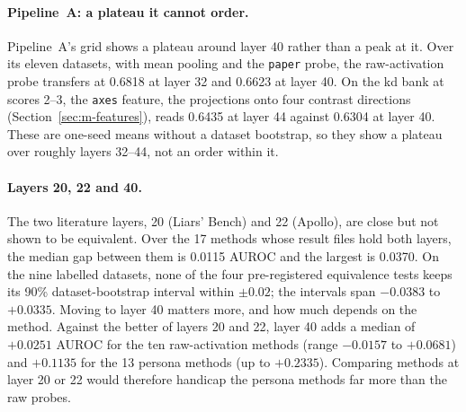 \paragraph{Pipeline~A: a plateau it cannot order.}
Pipeline~A's grid shows a plateau around layer 40 rather than a peak at it. %
Over its eleven datasets, with mean pooling and the \texttt{paper} probe, the raw-activation probe transfers at 0.6818 at layer 32 and 0.6623 at layer 40. %
On the kd bank at scores 2--3, the \texttt{axes} feature, the projections onto four contrast directions (Section~\ref{sec:m-features}), reads 0.6435 at layer 44 against 0.6304 at layer 40. %
These are one-seed means without a dataset bootstrap, so they show a plateau over roughly layers 32--44, not an order within it. %

\paragraph{Layers 20, 22 and 40.}
The two literature layers, 20 (Liars' Bench) and 22 (Apollo), are close but not shown to be equivalent. %
Over the 17 methods whose result files hold both layers, the median gap between them is 0.0115 AUROC and the largest is 0.0370. %
On the nine labelled datasets, none of the four pre-registered equivalence tests keeps its 90\% dataset-bootstrap interval within $\pm0.02$; the intervals span $-0.0383$ to $+0.0335$. %
Moving to layer 40 matters more, and how much depends on the method.
Against the better of layers 20 and 22, layer 40 adds a median of $+0.0251$ AUROC for the ten raw-activation methods (range $-0.0157$ to $+0.0681$) and $+0.1135$ for the 13 persona methods (up to $+0.2335$). %
Comparing methods at layer 20 or 22 would therefore handicap the persona methods far more than the raw probes. %

